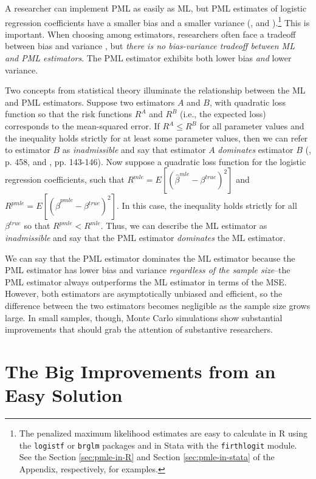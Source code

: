 \documentclass[12pt]{article}
\begin{document}
A researcher can implement PML as easily as ML, but PML estimates of logistic regression coefficients have a smaller bias \citep{Firth1993} and a smaller variance (\citealt[p. 49]{Kosmidis2007}, and \citealt{Copas1988}).\footnote{The penalized maximum likelihood estimates are easy to calculate in R using the \texttt{logistf} or \texttt{brglm} packages and in Stata with the \texttt{firthlogit} module. 
See the Section \ref{sec:pmle-in-R} and Section \ref{sec:pmle-in-stata} of the Appendix, respectively, for examples.}
This is important.
When choosing among estimators, researchers often face a tradeoff between bias and variance \citep[pp. 37-38]{HastieTibshiraniFriedman2013}, but \textit{there is no bias-variance tradeoff between ML and PML estimators}.
The PML estimator exhibits both lower bias \textit{and} lower variance.

Two concepts from statistical theory illuminate the relationship between the ML and PML estimators. 
Suppose two estimators $A$ and $B$, with quadratic loss function so that the risk functions $R^A$ and $R^B$ (i.e., the expected loss) corresponds to the mean-squared error. 
If $R^A \leq R^B$ for all parameter values and the inequality holds strictly for at least some parameter values, then we can refer to estimator $B$ as \textit{inadmissible} and say that estimator $A$ \textit{dominates} estimator $B$ (\citealt{DeGrootSchervish2012}, p. 458, and \citealt{LeonardHsu1999}, pp. 143-146). 
Now suppose a quadratic loss function for the logistic regression coefficients, such that $R^{mle} = E[(\hat{\beta}^{mle} - \beta^{true})^2]$ and $R^{pmle} = E[(\hat{\beta}^{pmle} - \beta^{true})^2]$. 
In this case, the inequality holds strictly for all $\beta^{true}$ so that $R^{pmle} < R^{mle}$. Thus, we can describe the ML estimator as \textit{inadmissible} and say that the PML estimator \textit{dominates} the ML estimator.

We can say that the PML estimator dominates the ML estimator because the PML estimator has lower bias and variance \textit{regardless of the sample size}--the PML estimator always outperforms the ML estimator in terms of the MSE.
However, both estimators are asymptotically unbiased and efficient, so the difference between the two estimators becomes negligible as the sample size grows large.
In small samples, though, Monte Carlo simulations show substantial improvements that should grab the attention of substantive researchers.

\section*{The Big Improvements from an Easy Solution}
\end{document}
